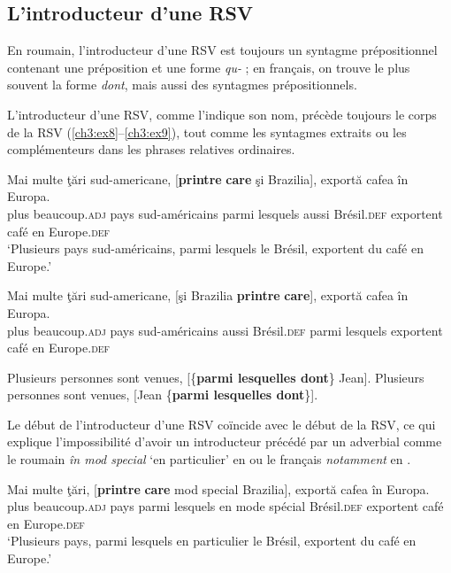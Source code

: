 \subsection{L’introducteur d’une RSV}\label{ch3:sect3.2.1}

En roumain, l’introducteur d’une RSV est toujours un syntagme prépositionnel contenant une préposition et une forme \textit{qu-} ; en français, on trouve le plus souvent la forme \textit{dont}, mais aussi des syntagmes prépositionnels.

L’introducteur d’une RSV, comme l’indique son nom, précède toujours le corps de la RSV (\ref{ch3:ex8}--\ref{ch3:ex9}), tout comme les syntagmes extraits ou les complémenteurs dans les phrases relatives ordinaires.

\ea \label{ch3:ex8}
\ea
\gll Mai  multe  ţări  sud-americane,  [\textbf{printre} \textbf{care} şi  Brazilia], exportă  cafea  în  Europa. \\
plus  beaucoup.\textsc{adj}  pays  sud-américains  parmi  lesquels  aussi  Brésil.\textsc{def} exportent  café  en  Europe.\textsc{def}\\
\glt ‘Plusieurs pays sud-américains, parmi lesquels le Brésil, exportent du café en Europe.’

\ex
\gll *Mai  multe  ţări  sud-americane,  [şi  Brazilia \textbf{printre} \textbf{care}], exportă  cafea  în  Europa. \\
plus  beaucoup.\textsc{adj}  pays  sud-américains  aussi  Brésil.\textsc{def}  parmi  lesquels exportent  café  en  Europe.\textsc{def}\\
\z
\z

\ea \label{ch3:ex9}
\ea Plusieurs personnes sont venues, [\{\textbf{parmi lesquelles {\textbar} dont}\} Jean].
\ex *Plusieurs personnes sont venues, [Jean \{\textbf{parmi lesquelles {\textbar} dont}\}].
\z
\z

Le début de l’introducteur d’une RSV coïncide avec le début de la RSV, ce qui explique l’impossibilité d’avoir un introducteur précédé par un adverbial comme le roumain \textit{în mod special} ‘en particulier’ en  ou le français \textit{notamment} en .  

\ea \label{ch3:ex10}
\ea
\gll Mai  multe  ţări,  [\textbf{printre} \textbf{care}   mod  special  Brazilia], exportă  cafea  în  Europa. \label{ch3:ex10a}\\
plus  beaucoup.\textsc{adj} pays  parmi  lesquels  en  mode  spécial  Brésil.\textsc{def} exportent  café  en  Europe.\textsc{def}\\
\glt ‘Plusieurs pays, parmi lesquels en particulier le Brésil, exportent du café en Europe.’

